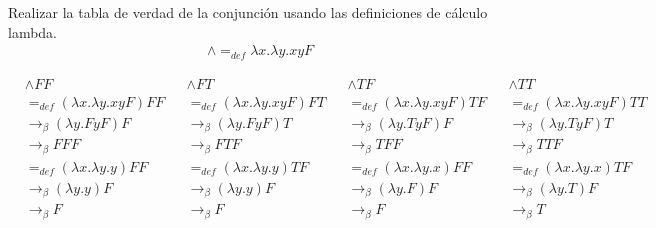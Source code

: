 \documentclass[answers]{exam}
\begin{document}
\begin{questions}
  \question[1] Realizar la tabla de verdad de la conjunción usando las
  definiciones de cálculo lambda.
  \begin{gather*}
    \land =_{def} \lambda x.\lambda y.xyF
  \end{gather*}
  \vspace{-3em}
  \begin{solution}
    \begin{align*}
      &\land FF &
      &\land FT &
      &\land TF &
      &\land TT \\
      &=_{def} (\lambda x.\lambda y.xyF)FF &
      &=_{def} (\lambda x.\lambda y.xyF)FT &
      &=_{def} (\lambda x.\lambda y.xyF)TF &
      &=_{def} (\lambda x.\lambda y.xyF)TT \\
      &\to_{\beta} (\lambda y.FyF)F &
      &\to_{\beta} (\lambda y.FyF)T &
      &\to_{\beta} (\lambda y.TyF)F &
      &\to_{\beta} (\lambda y.TyF)T \\
      &\to_{\beta} FFF &
      &\to_{\beta} FTF &
      &\to_{\beta} TFF &
      &\to_{\beta} TTF \\
      &=_{def} (\lambda x.\lambda y.y)FF &
      &=_{def} (\lambda x.\lambda y.y)TF &
      &=_{def} (\lambda x.\lambda y.x)FF &
      &=_{def} (\lambda x.\lambda y.x)TF \\
      &\to_{\beta} (\lambda y.y)F &
      &\to_{\beta} (\lambda y.y)F &
      &\to_{\beta} (\lambda y.F)F &
      &\to_{\beta} (\lambda y.T)F \\
      &\to_{\beta} F &
      &\to_{\beta} F &
      &\to_{\beta} F &
      &\to_{\beta} T \\
    \end{align*}
  \end{solution}
\end{questions}
\end{document}
